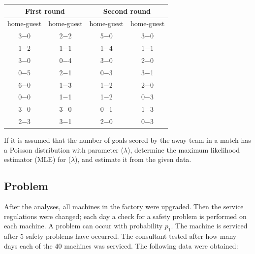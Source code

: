 \documentclass[a4paper, 12pt]{article}
\begin{document}
\begin{table}[h!]
\centering
\center
\begin{tabular}{|cc|cc|}
\hline
\multicolumn{2}{|c|}{First round}             & \multicolumn{2}{c|}{Second round}            \\ \hline
\multicolumn{1}{|c|}{home-guest} & home-guest & \multicolumn{1}{c|}{home-guest} & home-guest \\ \hline
\multicolumn{1}{|c|}{3$-$0}        & 2$-$2        & \multicolumn{1}{c|}{5$-$0}        & 3$-$0        \\ \hline
\multicolumn{1}{|c|}{1$-$2}        & 1$-$1        & \multicolumn{1}{c|}{1$-$4}        & 1$-$1        \\ \hline
\multicolumn{1}{|c|}{3$-$0}        & 0$-$4        & \multicolumn{1}{c|}{3$-$0}        & 2$-$0        \\ \hline
\multicolumn{1}{|c|}{0$-$5}        & 2$-$1        & \multicolumn{1}{c|}{0$-$3}        & 3$-$1        \\ \hline
\multicolumn{1}{|c|}{6$-$0}        & 1$-$3        & \multicolumn{1}{c|}{1$-$2}        & 2$-$0        \\ \hline
\multicolumn{1}{|c|}{0$-$0}        & 1$-$1        & \multicolumn{1}{c|}{1$-$2}        & 0$-$3        \\ \hline
\multicolumn{1}{|c|}{3$-$0}        & 3$-$0        & \multicolumn{1}{c|}{0$-$1}        & 1$-$3        \\ \hline
\multicolumn{1}{|c|}{2$-$3}        & 3$-$1        & \multicolumn{1}{c|}{2$-$0}        & 0$-$3        \\ \hline
\end{tabular}
\end{table}

 If it is assumed that the number of goals scored by the away team in a match has a Poisson distribution with parameter ($\lambda$), determine the maximum likelihood estimator (MLE) for ($\lambda$), and estimate it from the given data.

\subsection{Problem}

After the analyses, all machines in the factory were upgraded. Then the service regulations were changed; each day a check for a safety problem is performed on each machine. A problem can occur with probability $p_1$. The machine is serviced after 5 safety problems have occurred. The consultant tested after how many days each of the 40 machines was serviced. The following data were obtained:
\end{document}
